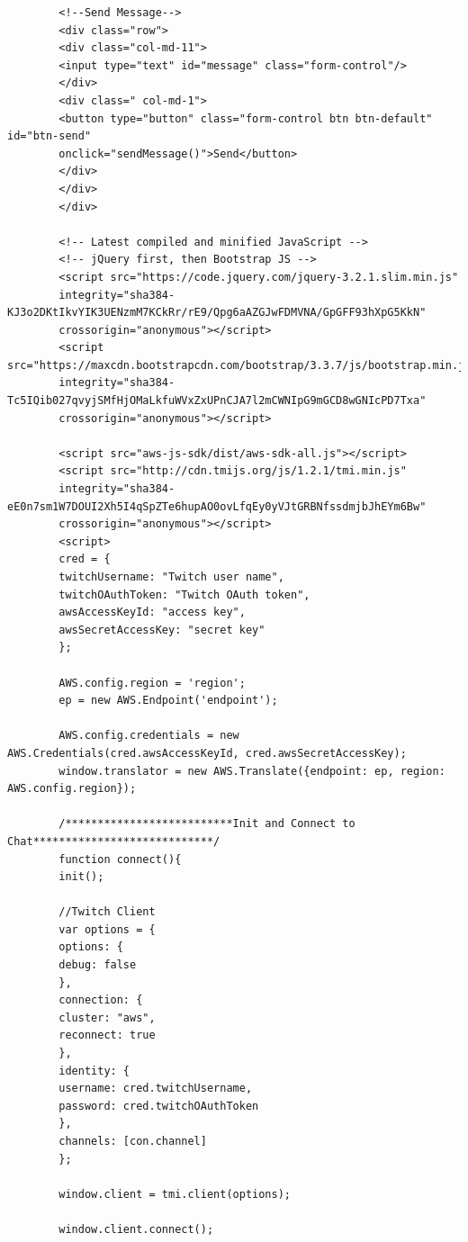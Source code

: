 \documentclass[english,runningheads,a4paper]{llncs}[2018/03/10]
\begin{document}
\begin{verbatim}
        <!--Send Message-->
        <div class="row">
        <div class="col-md-11">
        <input type="text" id="message" class="form-control"/>
        </div>
        <div class=" col-md-1">
        <button type="button" class="form-control btn btn-default" id="btn-send"
        onclick="sendMessage()">Send</button>
        </div>
        </div>
        </div>
        
        <!-- Latest compiled and minified JavaScript -->
        <!-- jQuery first, then Bootstrap JS -->
        <script src="https://code.jquery.com/jquery-3.2.1.slim.min.js"
        integrity="sha384-KJ3o2DKtIkvYIK3UENzmM7KCkRr/rE9/Qpg6aAZGJwFDMVNA/GpGFF93hXpG5KkN"
        crossorigin="anonymous"></script>
        <script src="https://maxcdn.bootstrapcdn.com/bootstrap/3.3.7/js/bootstrap.min.js"
        integrity="sha384-Tc5IQib027qvyjSMfHjOMaLkfuWVxZxUPnCJA7l2mCWNIpG9mGCD8wGNIcPD7Txa"
        crossorigin="anonymous"></script>
        
        <script src="aws-js-sdk/dist/aws-sdk-all.js"></script>
        <script src="http://cdn.tmijs.org/js/1.2.1/tmi.min.js"
        integrity="sha384-eE0n7sm1W7DOUI2Xh5I4qSpZTe6hupAO0ovLfqEy0yVJtGRBNfssdmjbJhEYm6Bw"
        crossorigin="anonymous"></script>
        <script>
        cred = {
        twitchUsername: "Twitch user name",
        twitchOAuthToken: "Twitch OAuth token",
        awsAccessKeyId: "access key",
        awsSecretAccessKey: "secret key"
        };
        
        AWS.config.region = 'region';
        ep = new AWS.Endpoint('endpoint');
        
        AWS.config.credentials = new AWS.Credentials(cred.awsAccessKeyId, cred.awsSecretAccessKey);
        window.translator = new AWS.Translate({endpoint: ep, region: AWS.config.region});
        
        /**************************Init and Connect to Chat****************************/
        function connect(){
        init();
        
        //Twitch Client
        var options = {
        options: {
        debug: false
        },
        connection: {
        cluster: "aws",
        reconnect: true
        },
        identity: {
        username: cred.twitchUsername,
        password: cred.twitchOAuthToken
        },
        channels: [con.channel]
        };
        
        window.client = tmi.client(options);
        
        window.client.connect();
        

\end{verbatim}
\end{document}
